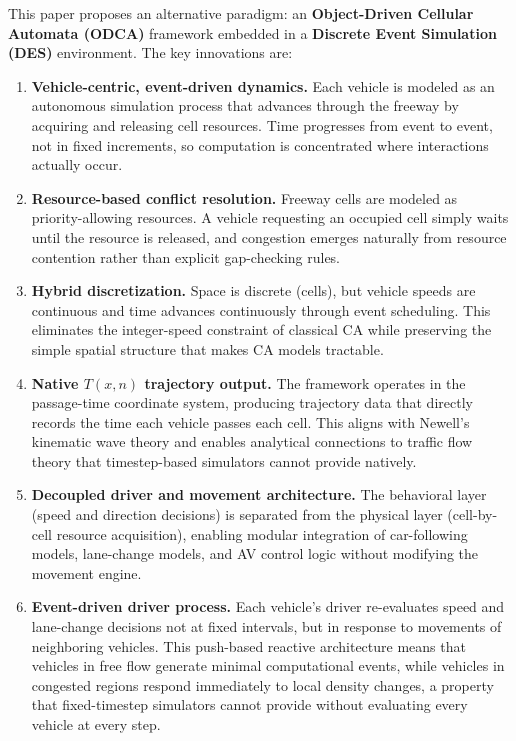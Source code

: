 \documentclass[review,authoryear]{elsarticle}
\begin{document}
This paper proposes an alternative paradigm: an \textbf{Object-Driven Cellular Automata (ODCA)} framework embedded in a \textbf{Discrete Event Simulation (DES)} environment. The key innovations are:

\begin{enumerate}
    \item \textbf{Vehicle-centric, event-driven dynamics.} Each vehicle is modeled as an autonomous simulation process that advances through the freeway by acquiring and releasing cell resources. Time progresses from event to event, not in fixed increments, so computation is concentrated where interactions actually occur.

    \item \textbf{Resource-based conflict resolution.} Freeway cells are modeled as priority-allowing resources. A vehicle requesting an occupied cell simply waits until the resource is released, and congestion emerges naturally from resource contention rather than explicit gap-checking rules.

    \item \textbf{Hybrid discretization.} Space is discrete (cells), but vehicle speeds are continuous and time advances continuously through event scheduling. This eliminates the integer-speed constraint of classical CA while preserving the simple spatial structure that makes CA models tractable.

    \item \textbf{Native $T(x,n)$ trajectory output.} The framework operates in the passage-time coordinate system, producing trajectory data that directly records the time each vehicle passes each cell. This aligns with Newell's kinematic wave theory \citep{newell1993simplified} and enables analytical connections to traffic flow theory that timestep-based simulators cannot provide natively.

    \item \textbf{Decoupled driver and movement architecture.} The behavioral layer (speed and direction decisions) is separated from the physical layer (cell-by-cell resource acquisition), enabling modular integration of car-following models, lane-change models, and AV control logic without modifying the movement engine.

    \item \textbf{Event-driven driver process.} Each vehicle's driver re-evaluates speed and lane-change decisions not at fixed intervals, but in response to movements of neighboring vehicles. This push-based reactive architecture means that vehicles in free flow generate minimal computational events, while vehicles in congested regions respond immediately to local density changes, a property that fixed-timestep simulators cannot provide without evaluating every vehicle at every step.


\end{enumerate}
\end{document}
